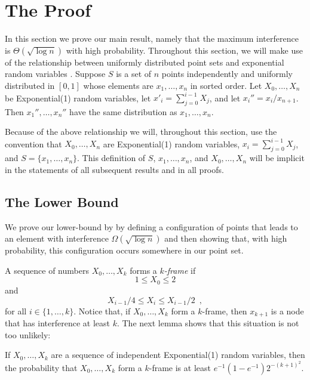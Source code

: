 \documentclass{patmorin}
\begin{document}
\section{The Proof}

In this section we prove our main result, namely that the maximum
interference is $\Theta(\sqrt{\log n})$ with high probability.
Throughout this section, we will make use of the relationship between
uniformly distributed point sets and exponential random variables
\cite[Chapter~V, Theorem~2.2]{d86}.  Suppose $S$ is a set of $n$ points
independently and uniformly distributed in $[0,1]$ whose elements are
$x_1,\ldots,x_n$ in sorted order.  Let $X_0,\ldots,X_n$ be Exponential(1)
random variables, let $x'_i=\sum_{j=0}^{i-1}X_j$, and let $x_i''=x_i/x_{n+1}$.
Then $x_1'',\ldots,x_n''$ have the same distribution as $x_1,\ldots,x_n$.

Because of the above relationship we will, throughout this section, use
the convention that $X_0,\ldots,X_n$ are Exponential(1) random variables,
$x_i=\sum_{j=0}^{i-1}X_j$, and $S=\{x_1,\ldots,x_n\}$.  This definition
of $S$, $x_1,\ldots,x_n$, and $X_0,\ldots,X_n$ will be implicit in the
statements of all subsequent results and in all proofs.

\subsection{The Lower Bound}

We prove our lower-bound by by defining a configuration of points that
leads to an element with interference $\Omega(\sqrt{\log n})$ and then
showing that, with high probability, this configuration occurs somewhere
in our point set.

A sequence of numbers $X_0,\ldots,X_k$ forms a \emph{$k$-frame} if
\[
     1 \le X_0 \le 2
\]
and
\[
     X_{i-1}/4 \le X_i \le X_{i-1}/2 \enspace ,
\]
for all $i\in\{1,\ldots,k\}$.  Notice that, if $X_0,\ldots,X_k$ form a
$k$-frame, then $x_{k+1}$ is a node that has interference at least $k$.
The next lemma shows that this situation is not too unlikely:

\begin{lem}
If $X_0,\ldots,X_k$ are a sequence of independent Exponential(1) random
variables, then the probability that $X_0,\ldots,X_k$ form a $k$-frame
is at least $e^{-1}(1-e^{-1})2^{-(k+1)^2}$.
\end{lem}
\end{document}
